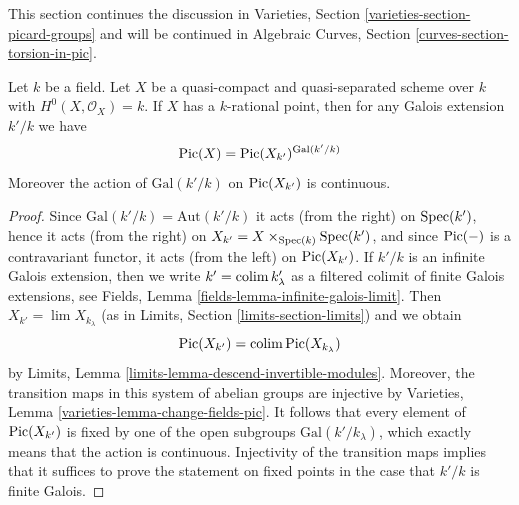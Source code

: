 \noindent
This section continues the discussion in
Varieties, Section \ref{varieties-section-picard-groups}
and will be continued in
Algebraic Curves, Section \ref{curves-section-torsion-in-pic}.

\begin{lemma}
\label{lemma-pic-descends}
Let $k$ be a field. Let $X$ be a quasi-compact and quasi-separated scheme
over $k$ with $H^0(X, \mathcal{O}_X) = k$. If $X$ has a $k$-rational point,
then for any Galois extension $k'/k$ we have
$$
\mathop{\mathrm{Pic}}\nolimits(X) = \mathop{\mathrm{Pic}}\nolimits(X_{k'})^{\text{Gal}(k'/k)}
$$
Moreover the action of $\text{Gal}(k'/k)$ on $\mathop{\mathrm{Pic}}\nolimits(X_{k'})$
is continuous.
\end{lemma}

\begin{proof}
Since $\text{Gal}(k'/k) = \text{Aut}(k'/k)$ it acts (from the right)
on $\mathop{\mathrm{Spec}}(k')$, hence it acts (from the right) on
$X_{k'} = X \times_{\mathop{\mathrm{Spec}}(k)} \mathop{\mathrm{Spec}}(k')$, and since $\mathop{\mathrm{Pic}}\nolimits(-)$
is a contravariant functor, it acts (from the left) on $\mathop{\mathrm{Pic}}\nolimits(X_{k'})$.
If $k'/k$ is an infinite Galois extension, then we write
$k' = \mathop{\mathrm{colim}}\nolimits k'_\lambda$ as a filtered colimit of finite Galois
extensions, see Fields, Lemma \ref{fields-lemma-infinite-galois-limit}.
Then $X_{k'} = \lim X_{k_\lambda}$
(as in Limits, Section \ref{limits-section-limits})
and we obtain
$$
\mathop{\mathrm{Pic}}\nolimits(X_{k'}) = \mathop{\mathrm{colim}}\nolimits \mathop{\mathrm{Pic}}\nolimits(X_{k_\lambda})
$$
by Limits, Lemma \ref{limits-lemma-descend-invertible-modules}.
Moreover, the transition maps in this system of abelian groups
are injective by Varieties, Lemma \ref{varieties-lemma-change-fields-pic}.
It follows that every element of $\mathop{\mathrm{Pic}}\nolimits(X_{k'})$ is fixed by
one of the open subgroups $\text{Gal}(k'/k_\lambda)$, which exactly
means that the action is continuous. Injectivity of the transition maps
implies that it suffices to prove the statement on fixed points in the
case that $k'/k$ is finite Galois.


\end{proof}
